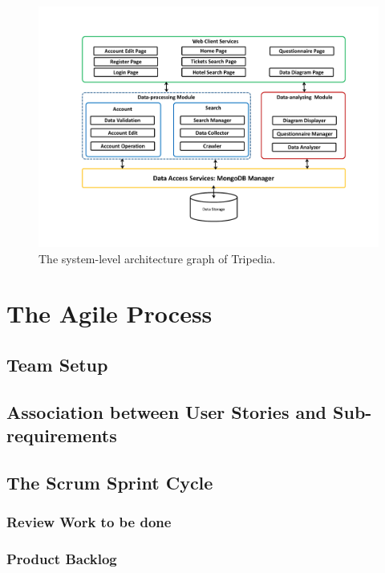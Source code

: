 \documentclass[conference]{IEEEtran}
\begin{document}
\begin{figure}[htbp]
\centerline{\includegraphics[width=1.0\textwidth]{Architecture2.pdf}}
\caption{The system-level architecture graph of Tripedia.}
\label{system_level_arch}
\end{figure}




\section{\textbf{The Agile Process}}


\subsection{\textbf{Team Setup}}



\subsection{\textbf{Association between User Stories and Sub-requirements}}

\subsection{\textbf{The Scrum Sprint Cycle}}

\subsubsection{\textbf{Review Work to be done}}


\subsubsection{\textbf{Product Backlog}}
\end{document}
